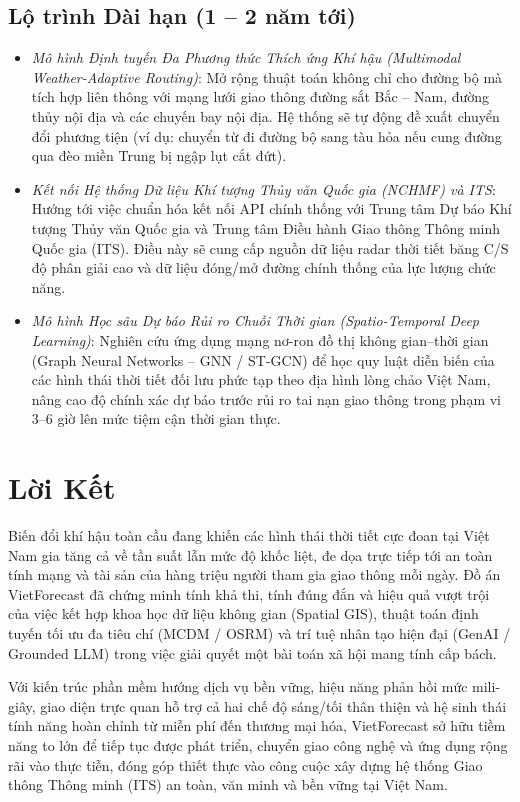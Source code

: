 \subsection{Lộ trình Dài hạn (1 -- 2 năm tới)}
\begin{itemize}
    \item[-] \textit{Mô hình Định tuyến Đa Phương thức Thích ứng Khí hậu (\textit{Multimodal Weather-Adaptive Routing})}: Mở rộng thuật toán không chỉ cho đường bộ mà tích hợp liên thông với mạng lưới giao thông đường sắt Bắc -- Nam, đường thủy nội địa và các chuyến bay nội địa. Hệ thống sẽ tự động đề xuất chuyển đổi phương tiện (ví dụ: chuyển từ đi đường bộ sang tàu hỏa nếu cung đường qua đèo miền Trung bị ngập lụt cắt đứt).
    \item[-] \textit{Kết nối Hệ thống Dữ liệu Khí tượng Thủy văn Quốc gia (NCHMF) và ITS}: Hướng tới việc chuẩn hóa kết nối API chính thống với Trung tâm Dự báo Khí tượng Thủy văn Quốc gia và Trung tâm Điều hành Giao thông Thông minh Quốc gia (ITS). Điều này sẽ cung cấp nguồn dữ liệu radar thời tiết băng C/S độ phân giải cao và dữ liệu đóng/mở đường chính thống của lực lượng chức năng.
    \item[-] \textit{Mô hình Học sâu Dự báo Rủi ro Chuỗi Thời gian (Spatio-Temporal Deep Learning)}: Nghiên cứu ứng dụng mạng nơ-ron đồ thị không gian--thời gian (Graph Neural Networks -- GNN / ST-GCN) để học quy luật diễn biến của các hình thái thời tiết đối lưu phức tạp theo địa hình lòng chảo Việt Nam, nâng cao độ chính xác dự báo trước rủi ro tai nạn giao thông trong phạm vi 3--6 giờ lên mức tiệm cận thời gian thực.
\end{itemize}

\section{Lời Kết}
\label{sec:closing_remarks}

Biến đổi khí hậu toàn cầu đang khiến các hình thái thời tiết cực đoan tại Việt Nam gia tăng cả về tần suất lẫn mức độ khốc liệt, đe dọa trực tiếp tới an toàn tính mạng và tài sản của hàng triệu người tham gia giao thông mỗi ngày. Đồ án VietForecast đã chứng minh tính khả thi, tính đúng đắn và hiệu quả vượt trội của việc kết hợp khoa học dữ liệu không gian (Spatial GIS), thuật toán định tuyến tối ưu đa tiêu chí (MCDM / OSRM) và trí tuệ nhân tạo hiện đại (GenAI / Grounded LLM) trong việc giải quyết một bài toán xã hội mang tính cấp bách.

Với kiến trúc phần mềm hướng dịch vụ bền vững, hiệu năng phản hồi mức mili-giây, giao diện trực quan hỗ trợ cả hai chế độ sáng/tối thân thiện và hệ sinh thái tính năng hoàn chỉnh từ miễn phí đến thương mại hóa, VietForecast sở hữu tiềm năng to lớn để tiếp tục được phát triển, chuyển giao công nghệ và ứng dụng rộng rãi vào thực tiễn, đóng góp thiết thực vào công cuộc xây dựng hệ thống Giao thông Thông minh (ITS) an toàn, văn minh và bền vững tại Việt Nam.

